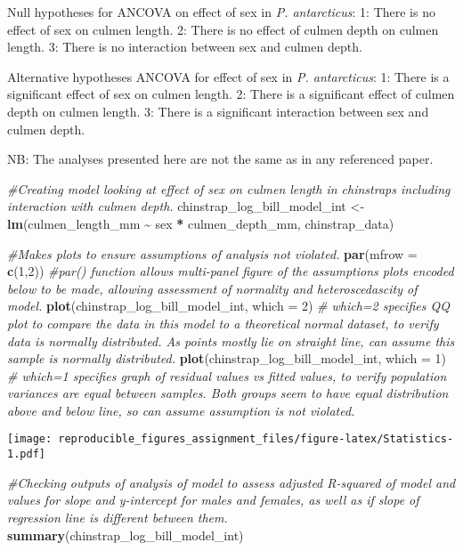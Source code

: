 \documentclass[
]{article}
\newenvironment{Shaded}{\begin{snugshade}}{\end{snugshade}}
\newcommand{\AttributeTok}[1]{\textcolor[rgb]{0.13,0.29,0.53}{#1}}
\newcommand{\CommentTok}[1]{\textcolor[rgb]{0.56,0.35,0.01}{\textit{#1}}}
\newcommand{\DecValTok}[1]{\textcolor[rgb]{0.00,0.00,0.81}{#1}}
\newcommand{\FunctionTok}[1]{\textcolor[rgb]{0.13,0.29,0.53}{\textbf{#1}}}
\newcommand{\NormalTok}[1]{#1}
\newcommand{\OtherTok}[1]{\textcolor[rgb]{0.56,0.35,0.01}{#1}}
\newcommand{\SpecialCharTok}[1]{\textcolor[rgb]{0.81,0.36,0.00}{\textbf{#1}}}
\begin{document}
Null hypotheses for ANCOVA on effect of sex in \emph{P. antarcticus}: 1:
There is no effect of sex on culmen length. 2: There is no effect of
culmen depth on culmen length. 3: There is no interaction between sex
and culmen depth.

Alternative hypotheses ANCOVA for effect of sex in \emph{P.
antarcticus}: 1: There is a significant effect of sex on culmen length.
2: There is a significant effect of culmen depth on culmen length. 3:
There is a significant interaction between sex and culmen depth.

NB: The analyses presented here are not the same as in any referenced
paper.

\begin{Shaded}
\begin{Highlighting}[]
\CommentTok{\#Creating model looking at effect of sex on culmen length in chinstraps including interaction with culmen depth.}
\NormalTok{chinstrap\_log\_bill\_model\_int }\OtherTok{\textless{}{-}} \FunctionTok{lm}\NormalTok{(culmen\_length\_mm }\SpecialCharTok{\textasciitilde{}}\NormalTok{ sex }\SpecialCharTok{*}\NormalTok{ culmen\_depth\_mm, chinstrap\_data)}

\CommentTok{\#Makes plots to ensure assumptions of analysis not violated.}
\FunctionTok{par}\NormalTok{(}\AttributeTok{mfrow =} \FunctionTok{c}\NormalTok{(}\DecValTok{1}\NormalTok{,}\DecValTok{2}\NormalTok{)) }\CommentTok{\#par() function allows multi{-}panel figure of the assumptions plots encoded below to be made, allowing assessment of normality and heteroscedascity of model.}
\FunctionTok{plot}\NormalTok{(chinstrap\_log\_bill\_model\_int, }\AttributeTok{which =} \DecValTok{2}\NormalTok{) }\CommentTok{\# which=2 specifies QQ plot to compare the data in this model to a theoretical normal dataset, to verify data is normally distributed. As points mostly lie on straight line, can assume this sample is normally distributed.}
\FunctionTok{plot}\NormalTok{(chinstrap\_log\_bill\_model\_int, }\AttributeTok{which =} \DecValTok{1}\NormalTok{) }\CommentTok{\# which=1 specifies graph of residual values vs fitted values, to verify population variances are equal between samples. Both groups seem to have equal distribution above and below line, so can assume assumption is not violated.}
\end{Highlighting}
\end{Shaded}

\texttt{[image: reproducible\_figures\_assignment\_files/figure-latex/Statistics-1.pdf]}

\begin{Shaded}
\begin{Highlighting}[]
\CommentTok{\#Checking outputs of analysis of model to assess adjusted R{-}squared of model and values for slope and y{-}intercept for males and females, as well as if slope of regression line is different between them.}
\FunctionTok{summary}\NormalTok{(chinstrap\_log\_bill\_model\_int)}
\end{Highlighting}
\end{Shaded}
\end{document}
